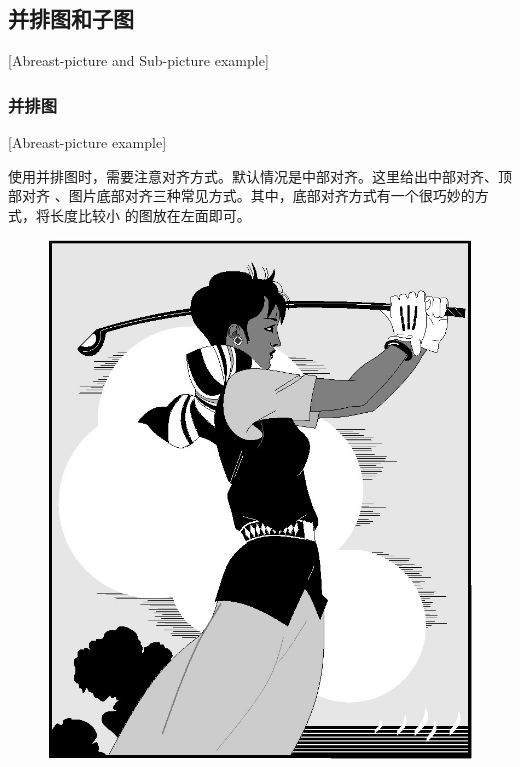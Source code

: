 \subsection{并排图和子图}[Abreast-picture and Sub-picture example]
\subsubsection{并排图}[Abreast-picture example]

使用并排图时，需要注意对齐方式。默认情况是中部对齐。这里给出中部对齐、顶部对齐
、图片底部对齐三种常见方式。其中，底部对齐方式有一个很巧妙的方式，将长度比较小
的图放在左面即可。

\begin{figure}[htbp]
\centering
\begin{minipage}{0.4\textwidth}
\centering
\includegraphics[width=\textwidth]{golfer}
\end{minipage}
\centering
\begin{minipage}{0.4\textwidth}
\centering

\end{minipage}
\end{figure}
